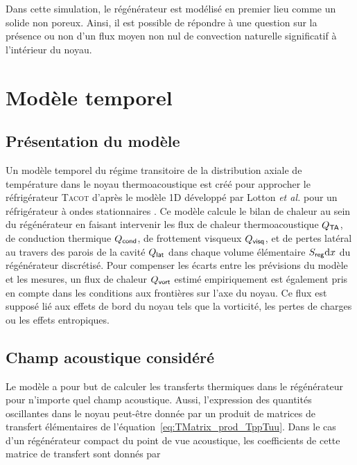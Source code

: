 Dans cette simulation, le régénérateur est modélisé en premier lieu comme un solide non poreux. Ainsi, il est possible de répondre à une question sur la présence ou non d'un flux moyen non nul de convection naturelle significatif à l'intérieur du noyau.

\section{Modèle temporel} \label{chap:ModeleTemporel}
\subsection{Présentation du modèle}
Un modèle temporel du régime transitoire de la distribution axiale de température dans le noyau thermoacoustique est créé pour approcher le réfrigérateur \textsc{Tacot} d'après le modèle 1D développé par Lotton \textit{et al.} pour un réfrigérateur à ondes stationnaires \cite{lotton_transient_2009}. Ce modèle calcule le bilan de chaleur au sein du régénérateur en faisant intervenir les flux de chaleur thermoacoustique $Q_{\sf TA}$, de conduction thermique $Q_{\sf cond}$, de frottement visqueux $Q_{\sf visq}$, et de pertes latéral au travers des parois de la cavité $Q_{\sf lat}$ dans chaque volume élémentaire $S_{\sf reg} \mathrm{d} x$ du régénérateur discrétisé. Pour compenser les écarts entre les prévisions du modèle et les mesures, un flux de chaleur $Q_{\sf vort}$ estimé empiriquement est également pris en compte dans les conditions aux frontières sur l'axe du noyau. Ce flux est supposé lié aux effets de bord du noyau tels que la vorticité, les pertes de charges ou les effets entropiques. 

\subsection{Champ acoustique considéré}
Le modèle a pour but de calculer les transferts thermiques dans le régénérateur pour n'importe quel champ acoustique. Aussi, l'expression des quantités oscillantes dans le noyau peut-être donnée par un produit de matrices de transfert élémentaires de l'équation~\eqref{eq:TMatrix_prod_TppTuu}. Dans le cas d'un régénérateur compact du point de vue acoustique, les coefficients de cette matrice de transfert sont donnés par



